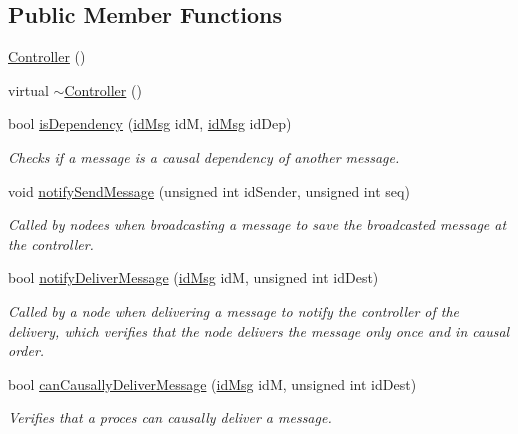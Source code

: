 \subsection*{Public Member Functions}
\begin{DoxyCompactItemize}
\item 
\hyperlink{class_controller_a95c56822d667e94b031451729ce069a9}{Controller} ()
\item 
virtual \hyperlink{class_controller_a0ab87934c4f7a266cfdb86e0f36bc1b5}{$\sim$\+Controller} ()
\item 
bool \hyperlink{class_controller_ad76a99df69bf99705dc18ba72b4b04c2}{is\+Dependency} (\hyperlink{structures_8h_a83a1d9a070efa5341da84cfd8e28d3e5}{id\+Msg} idM, \hyperlink{structures_8h_a83a1d9a070efa5341da84cfd8e28d3e5}{id\+Msg} id\+Dep)
\begin{DoxyCompactList}\small\item\em Checks if a message is a causal dependency of another message. \end{DoxyCompactList}\item 
void \hyperlink{class_controller_a7207304a07534e50a690f26c765b4a71}{notify\+Send\+Message} (unsigned int id\+Sender, unsigned int seq)
\begin{DoxyCompactList}\small\item\em Called by nodees when broadcasting a message to save the broadcasted message at the controller. \end{DoxyCompactList}\item 
bool \hyperlink{class_controller_a8905abf1976e737410ac0142001e38a0}{notify\+Deliver\+Message} (\hyperlink{structures_8h_a83a1d9a070efa5341da84cfd8e28d3e5}{id\+Msg} idM, unsigned int id\+Dest)
\begin{DoxyCompactList}\small\item\em Called by a node when delivering a message to notify the controller of the delivery, which verifies that the node delivers the message only once and in causal order. \end{DoxyCompactList}\item 
bool \hyperlink{class_controller_ab57c4459f002be63b4deda1d7c3c3e29}{can\+Causally\+Deliver\+Message} (\hyperlink{structures_8h_a83a1d9a070efa5341da84cfd8e28d3e5}{id\+Msg} idM, unsigned int id\+Dest)
\begin{DoxyCompactList}\small\item\em Verifies that a proces can causally deliver a message. \end{DoxyCompactList}\end{DoxyCompactItemize}
